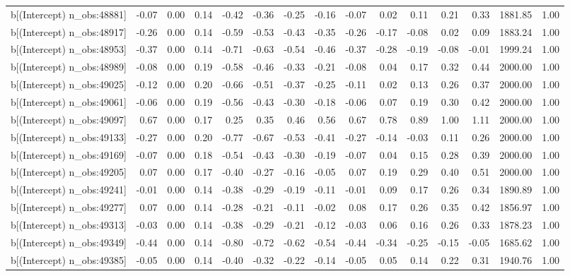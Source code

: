 \begin{table}[ht]
\begin{tabular}{rrrrrrrrrrrrrrr}
  b[(Intercept) n\_obs:48881] & -0.07 & 0.00 & 0.14 & -0.42 & -0.36 & -0.25 & -0.16 & -0.07 & 0.02 & 0.11 & 0.21 & 0.33 & 1881.85 & 1.00 \\ 
  b[(Intercept) n\_obs:48917] & -0.26 & 0.00 & 0.14 & -0.59 & -0.53 & -0.43 & -0.35 & -0.26 & -0.17 & -0.08 & 0.02 & 0.09 & 1883.24 & 1.00 \\ 
  b[(Intercept) n\_obs:48953] & -0.37 & 0.00 & 0.14 & -0.71 & -0.63 & -0.54 & -0.46 & -0.37 & -0.28 & -0.19 & -0.08 & -0.01 & 1999.24 & 1.00 \\ 
  b[(Intercept) n\_obs:48989] & -0.08 & 0.00 & 0.19 & -0.58 & -0.46 & -0.33 & -0.21 & -0.08 & 0.04 & 0.17 & 0.32 & 0.44 & 2000.00 & 1.00 \\ 
  b[(Intercept) n\_obs:49025] & -0.12 & 0.00 & 0.20 & -0.66 & -0.51 & -0.37 & -0.25 & -0.11 & 0.02 & 0.13 & 0.26 & 0.37 & 2000.00 & 1.00 \\ 
  b[(Intercept) n\_obs:49061] & -0.06 & 0.00 & 0.19 & -0.56 & -0.43 & -0.30 & -0.18 & -0.06 & 0.07 & 0.19 & 0.30 & 0.42 & 2000.00 & 1.00 \\ 
  b[(Intercept) n\_obs:49097] & 0.67 & 0.00 & 0.17 & 0.25 & 0.35 & 0.46 & 0.56 & 0.67 & 0.78 & 0.89 & 1.00 & 1.11 & 2000.00 & 1.00 \\ 
  b[(Intercept) n\_obs:49133] & -0.27 & 0.00 & 0.20 & -0.77 & -0.67 & -0.53 & -0.41 & -0.27 & -0.14 & -0.03 & 0.11 & 0.26 & 2000.00 & 1.00 \\ 
  b[(Intercept) n\_obs:49169] & -0.07 & 0.00 & 0.18 & -0.54 & -0.43 & -0.30 & -0.19 & -0.07 & 0.04 & 0.15 & 0.28 & 0.39 & 2000.00 & 1.00 \\ 
  b[(Intercept) n\_obs:49205] & 0.07 & 0.00 & 0.17 & -0.40 & -0.27 & -0.16 & -0.05 & 0.07 & 0.19 & 0.29 & 0.40 & 0.51 & 2000.00 & 1.00 \\ 
  b[(Intercept) n\_obs:49241] & -0.01 & 0.00 & 0.14 & -0.38 & -0.29 & -0.19 & -0.11 & -0.01 & 0.09 & 0.17 & 0.26 & 0.34 & 1890.89 & 1.00 \\ 
  b[(Intercept) n\_obs:49277] & 0.07 & 0.00 & 0.14 & -0.28 & -0.21 & -0.11 & -0.02 & 0.08 & 0.17 & 0.26 & 0.35 & 0.42 & 1856.97 & 1.00 \\ 
  b[(Intercept) n\_obs:49313] & -0.03 & 0.00 & 0.14 & -0.38 & -0.29 & -0.21 & -0.12 & -0.03 & 0.06 & 0.16 & 0.26 & 0.33 & 1878.23 & 1.00 \\ 
  b[(Intercept) n\_obs:49349] & -0.44 & 0.00 & 0.14 & -0.80 & -0.72 & -0.62 & -0.54 & -0.44 & -0.34 & -0.25 & -0.15 & -0.05 & 1685.62 & 1.00 \\ 
  b[(Intercept) n\_obs:49385] & -0.05 & 0.00 & 0.14 & -0.40 & -0.32 & -0.22 & -0.14 & -0.05 & 0.05 & 0.14 & 0.22 & 0.31 & 1940.76 & 1.00 \\ 

\end{tabular}
\end{table}
